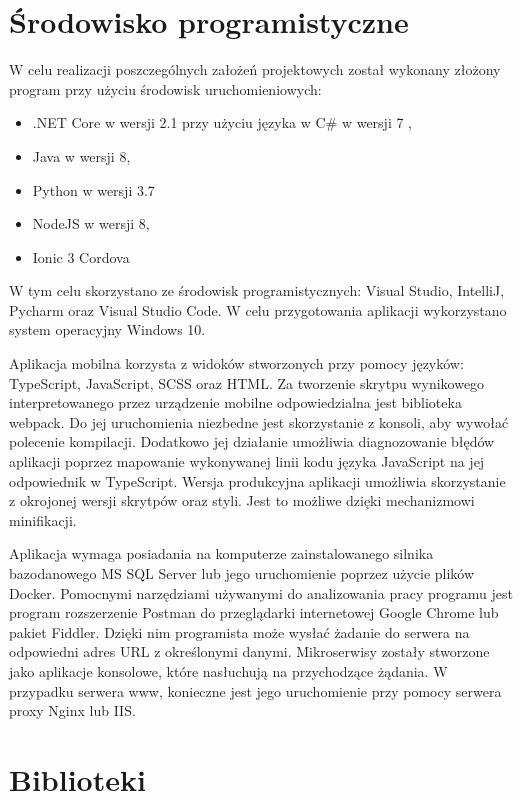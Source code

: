 \section{Środowisko programistyczne}
W celu realizacji poszczególnych założeń projektowych został wykonany złożony program przy użyciu środowisk uruchomieniowych: 
\begin{itemize}[noitemsep]
	\item .NET Core w wersji 2.1 przy użyciu języka w C\# w wersji 7 ,
	\item Java w wersji 8,
	\item Python w wersji 3.7
	\item NodeJS w wersji 8,
	\item Ionic 3 Cordova
\end{itemize}
W tym celu skorzystano ze środowisk programistycznych: Visual Studio, IntelliJ, Pycharm oraz Visual Studio Code. W celu przygotowania aplikacji wykorzystano system operacyjny Windows 10.

Aplikacja mobilna korzysta z widoków stworzonych przy pomocy języków: TypeScript, JavaScript, SCSS oraz HTML. Za tworzenie skrytpu wynikowego interpretowanego przez urządzenie mobilne odpowiedzialna jest biblioteka webpack. Do jej uruchomienia niezbedne jest skorzystanie z konsoli, aby wywołać polecenie kompilacji. Dodatkowo jej działanie umożliwia diagnozowanie błędów aplikacji poprzez mapowanie wykonywanej linii kodu języka JavaScript na jej odpowiednik w TypeScript. Wersja produkcyjna aplikacji umożliwia skorzystanie z okrojonej wersji skrytpów oraz styli. Jest to możliwe dzięki mechanizmowi minifikacji.

Aplikacja wymaga posiadania na komputerze zainstalowanego silnika bazodanowego MS SQL Server lub jego uruchomienie poprzez użycie plików Docker. Pomocnymi narzędziami używanymi do analizowania pracy programu jest program rozszerzenie Postman\cite{Postman:limitation} do przeglądarki internetowej Google Chrome lub pakiet Fiddler\cite{Fiddler:limitation}. Dzięki nim programista może wysłać żadanie do serwera na odpowiedni adres URL z określonymi danymi. Mikroserwisy zostały stworzone jako aplikacje konsolowe, które nasłuchują na przychodzące żądania. W przypadku serwera www, konieczne jest jego uruchomienie przy pomocy serwera proxy Nginx lub IIS.

\newpage

\section{Biblioteki}

